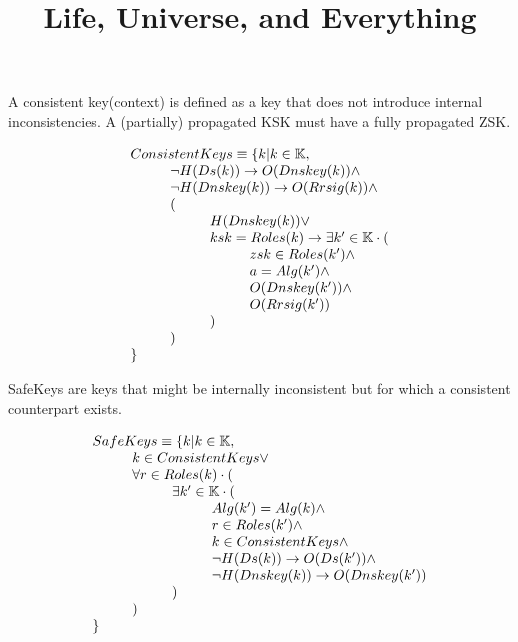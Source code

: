 \documentclass{article}
\title{Life, Universe, and Everything}
\begin{document}
\maketitle

A consistent key(context) is defined as a key that does not introduce 
internal inconsistencies. A (partially) propagated KSK must have a fully
propagated ZSK.

\begin{displaymath}
\begin{array}{l}
ConsistentKeys \equiv \{ k | k\in\mathbb{K}, \\
\hskip 1cm	\neg H(Ds(k)) \rightarrow O(Dnskey(k)) \wedge \\
\hskip 1cm	\neg H(Dnskey(k)) \rightarrow O(Rrsig(k)) \wedge \\
\hskip 1cm	( \\
\hskip 2cm		H(Dnskey(k)) \vee \\
\hskip 2cm		ksk=Roles(k) \rightarrow \exists k' \in \mathbb{K} \cdot (\\
\hskip 3cm			zsk \in Roles(k') \wedge \\
\hskip 3cm			a=Alg(k') \wedge \\
\hskip 3cm			O(Dnskey(k')) \wedge \\
\hskip 3cm			O(Rrsig(k'))\\
\hskip 2cm		)\\
\hskip 1cm	)\\
\}
\end{array}
\end{displaymath}

SafeKeys are keys that might be internally inconsistent but for which
a consistent counterpart exists.

\begin{displaymath}
\begin{array}{l}
SafeKeys \equiv \{ k | k\in\mathbb{K}, \\
\hskip 1cm 		k \in ConsistentKeys \vee \\
\hskip 1cm 		\forall r \in Roles(k) \cdot ( \\
\hskip 2cm 			\exists k' \in \mathbb{K} \cdot ( \\
\hskip 3cm 				Alg(k') = Alg(k) \wedge \\
\hskip 3cm 				r \in Roles(k') \wedge \\
\hskip 3cm 				k \in ConsistentKeys \wedge \\
\hskip 3cm 				\neg H(Ds(k)) \rightarrow O(Ds(k')) \wedge \\
\hskip 3cm 				\neg H(Dnskey(k)) \rightarrow O(Dnskey(k')) \\
\hskip 2cm 			)\\
\hskip 1cm 		)\\
\}
\end{array}
\end{displaymath}
\end{document}
